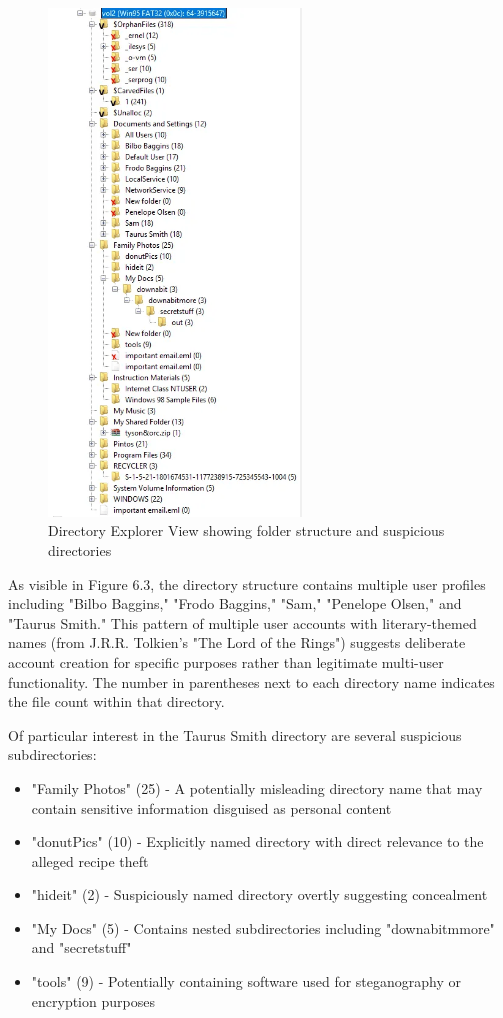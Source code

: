 \begin{figure}[htbp]
    \centering
    \includegraphics[width=0.6\textwidth]{images/Evidence Examination/Image3.png}
    \caption{Directory Explorer View showing folder structure and suspicious directories}
    \label{fig:directory_explorer}
\end{figure}

As visible in Figure 6.3, the directory structure contains multiple user profiles including "Bilbo Baggins," "Frodo Baggins," "Sam," "Penelope Olsen," and "Taurus Smith." This pattern of multiple user accounts with literary-themed names (from J.R.R. Tolkien's "The Lord of the Rings") suggests deliberate account creation for specific purposes rather than legitimate multi-user functionality. The number in parentheses next to each directory name indicates the file count within that directory.

Of particular interest in the Taurus Smith directory are several suspicious subdirectories:

\begin{itemize}
    \item "Family Photos" (25) - A potentially misleading directory name that may contain sensitive information disguised as personal content
    \item "donutPics" (10) - Explicitly named directory with direct relevance to the alleged recipe theft
    \item "hideit" (2) - Suspiciously named directory overtly suggesting concealment
    \item "My Docs" (5) - Contains nested subdirectories including "downabitmmore" and "secretstuff"
    \item "tools" (9) - Potentially containing software used for steganography or encryption purposes
\end{itemize}

